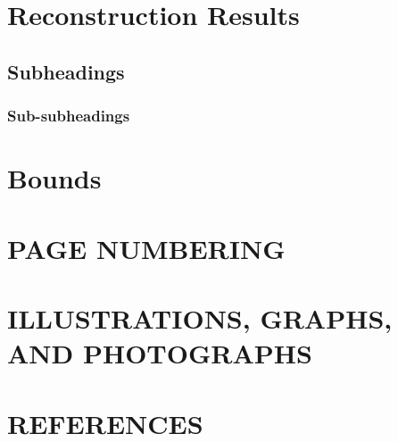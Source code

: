 \documentclass{article}
\begin{document}
\section{Reconstruction Results}

\subsection{Subheadings}

\subsubsection{Sub-subheadings}

\section{Bounds}

\section{PAGE NUMBERING}

\section{ILLUSTRATIONS, GRAPHS, AND PHOTOGRAPHS}



\vfill\pagebreak

\section{REFERENCES}
\label{sec:refs}




\end{document}
